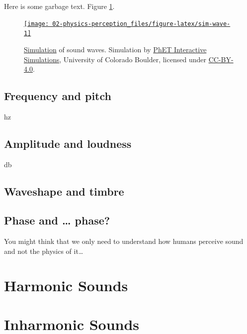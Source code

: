 \documentclass[
]{book}
\begin{document}
Here is some garbage text. Figure \ref{fig:sim-wave}.



\begin{figure}
\href{https://phet.colorado.edu/sims/html/waves-intro/latest/waves-intro_en.html}{\texttt{[image: 02-physics-perception\_files/figure-latex/sim-wave-1]} }\caption{\href{https://phet.colorado.edu/sims/html/waves-intro/latest/waves-intro_en.html}{Simulation} of sound waves. Simulation by \href{https://phet.colorado.edu/}{PhET Interactive Simulations}, University of Colorado Boulder, licensed under \href{https://creativecommons.org/licenses/by/4.0/}{CC-BY-4.0}.}\label{fig:sim-wave}
\end{figure}

\hypertarget{frequency-and-pitch}{%
\section{Frequency and pitch}\label{frequency-and-pitch}}

hz

\hypertarget{amplitude-and-loudness}{%
\section{Amplitude and loudness}\label{amplitude-and-loudness}}

db

\hypertarget{waveshape-and-timbre}{%
\section{Waveshape and timbre}\label{waveshape-and-timbre}}

\hypertarget{phase-and-phase}{%
\section{Phase and \ldots{} phase?}\label{phase-and-phase}}

You might think that we only need to understand how humans perceive sound and not the physics of it\ldots{}

\hypertarget{harmonic-sounds}{%
\chapter{Harmonic Sounds}\label{harmonic-sounds}}

\hypertarget{inharmonic-sounds}{%
\chapter{Inharmonic Sounds}\label{inharmonic-sounds}}
\end{document}
